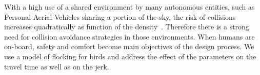 With a high use of a shared environment by many autonomous entities, such as Personal Aerial Vehicles sharing a portion of the sky, the risk of collisions increases quadratically as function of the density~\cite{jardin_analytical_2005}. Therefore there is a strong need for collision avoidance strategies in those environments. When humans are on-board, safety and comfort become main objectives of the design process. We use a model of flocking for birds and address the effect of the parameters on the travel time as well as on the jerk. 